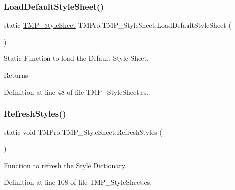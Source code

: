 \subsubsection{\texorpdfstring{LoadDefaultStyleSheet()}{LoadDefaultStyleSheet()}}
{\footnotesize\ttfamily static \mbox{\hyperlink{class_t_m_pro_1_1_t_m_p___style_sheet}{T\+M\+P\+\_\+\+Style\+Sheet}} T\+M\+Pro.\+T\+M\+P\+\_\+\+Style\+Sheet.\+Load\+Default\+Style\+Sheet (\begin{DoxyParamCaption}{ }\end{DoxyParamCaption})\hspace{0.3cm}{\ttfamily [static]}}



Static Function to load the Default Style Sheet. 

\begin{DoxyReturn}{Returns}

\end{DoxyReturn}


Definition at line 48 of file T\+M\+P\+\_\+\+Style\+Sheet.\+cs.

\mbox{\label{class_t_m_pro_1_1_t_m_p___style_sheet_aa7ee1ff983631f35b479fbda8df90829}} 
\subsubsection{\texorpdfstring{RefreshStyles()}{RefreshStyles()}}
{\footnotesize\ttfamily static void T\+M\+Pro.\+T\+M\+P\+\_\+\+Style\+Sheet.\+Refresh\+Styles (\begin{DoxyParamCaption}{ }\end{DoxyParamCaption})\hspace{0.3cm}{\ttfamily [static]}}



Function to refresh the Style Dictionary. 



Definition at line 108 of file T\+M\+P\+\_\+\+Style\+Sheet.\+cs.

\mbox{\label{class_t_m_pro_1_1_t_m_p___style_sheet_af80d7de5e502d36e00ccfe5f281ed3cb}} 
